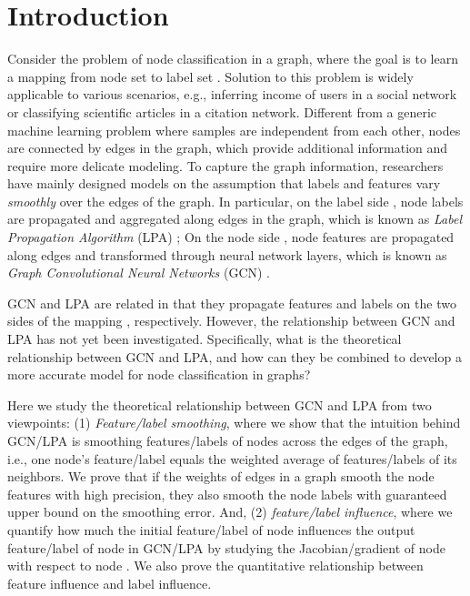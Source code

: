 \documentclass{article}
\begin{document}
\section{Introduction}
	Consider the problem of node classification in a graph, where the goal is to learn a mapping  from node set  to label set .
	Solution to this problem is widely applicable to various scenarios, e.g., inferring income of users in a social network or classifying scientific articles in a citation network.
	Different from a generic machine learning problem where samples are independent from each other, nodes are connected by edges in the graph, which provide additional information and require more delicate modeling.
	To capture the graph information, researchers have mainly designed models on the assumption that labels and features vary \textit{smoothly} over the edges of the graph. 
	In particular, on the label side , node labels are propagated and aggregated along edges in the graph, which is known as \textit{Label Propagation Algorithm} (LPA) \citep{zhu2005semi, zhou2004learning, zhang2007hyperparameter, wang2008label, karasuyama2013manifold, gong2017label, liu2018learning};
	On the node side , node features are propagated along edges and transformed through neural network layers, which is known as \textit{Graph Convolutional Neural Networks} (GCN) \citep{kipf2017semi, hamilton2017inductive, li2018deeper, xu2018representation,liao2019lanczosnet,xu2019powerful,qu2019gmnn}.
	
	GCN and LPA are related in that they propagate features and labels on the two sides of the mapping , respectively.
	However, the relationship between GCN and LPA has not yet been investigated.
	Specifically, what is the theoretical relationship between GCN and LPA, and how can they be combined to develop a more accurate model for node classification in graphs?
	
	Here we study the theoretical relationship between GCN and LPA from two viewpoints:
	(1) \textit{Feature/label smoothing}, where we show that the intuition behind GCN/LPA is smoothing features/labels of nodes across the edges of the graph, i.e., one node's feature/label equals the weighted average of features/labels of its neighbors.
	We prove that if the weights of edges in a graph smooth the node features with high precision, they also smooth the node labels with guaranteed upper bound on the smoothing error.
	And, (2) \textit{feature/label influence},
	where we quantify how much the initial feature/label of node  influences the output feature/label of node  in GCN/LPA by studying the Jacobian/gradient of node  with respect to node .
	We also prove the quantitative relationship between feature influence and label influence.
	
\end{document}
